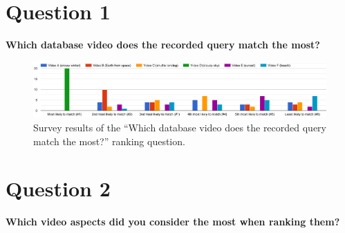 \section{Question 1}

\textbf{Which database video does the recorded query match the most?}

\begin{figure}[h] 
\centerline{\includegraphics[width=1.1\textwidth]{figures/appendix/survey_results.png}}
\caption{\label{fig:appendix_survey_results}Survey results of the ``Which database video does the recorded query match the most?'' ranking question.}
\end{figure}

\section{Question 2}

\textbf{Which video aspects did you consider the most when ranking them?}

